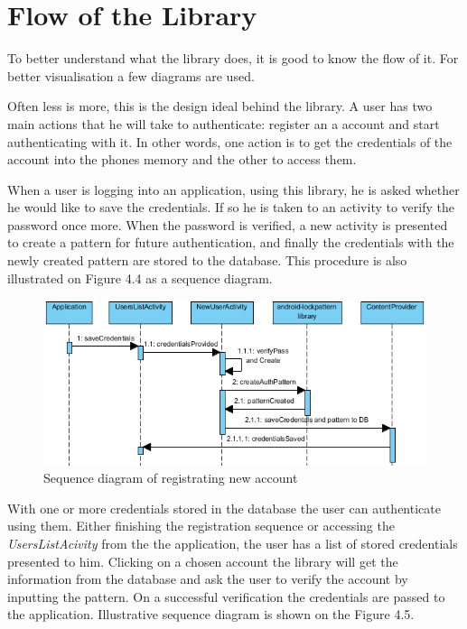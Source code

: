 \newpage

\section{Flow of the Library}
To better understand what the library does, it is good to know the flow of it. For better visualisation a few diagrams are used.

Often less is more, this is the design ideal behind the library. A user has two main actions that he will take to authenticate: register an a account and start authenticating with it. In other words, one action is to get the credentials of the account into the phones memory and the other to access them.
 
When a user is logging into an application, using this library, he is asked whether he would like to save the credentials. If so he is taken to an activity to verify the password once more. When the password is verified, a new activity is presented to create a pattern for future authentication, and finally the credentials with the newly created pattern are stored to the database. This procedure is also illustrated on Figure 4.4 as a sequence diagram.

\begin{figure}[h]
\begin{center}
\includegraphics[scale=0.9]{images/sequencediagramnew.png}
\caption{Sequence diagram of registrating new account} \label{fig:sequence diagram} 
\end{center}
\end{figure}

With one or more credentials stored in the database the user can authenticate using them. Either finishing the registration sequence or accessing the \textit{UsersListAcivity} from the the application, the user has a list of stored credentials presented to him. Clicking on a chosen account the library will get the information from the database and ask the user to verify the account by inputting the pattern. On a successful verification the credentials are passed to the application. Illustrative sequence diagram is shown on the Figure 4.5.

